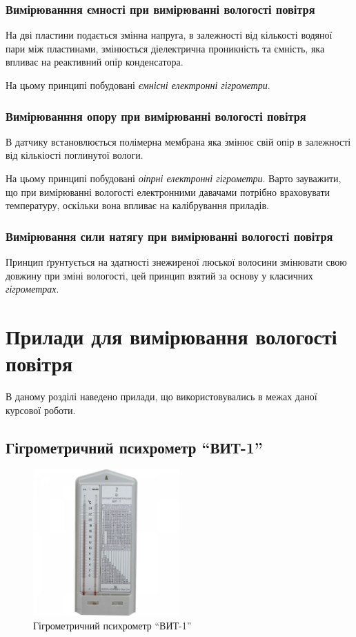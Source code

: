 \subsubsection{Вимірюванння ємності  при вимірюванні вологості повітря}

На дві пластини подається змінна напруга, в залежності від кількості водяної пари між пластинами,
змінюється діелектрична проникність та ємність, яка впливає на реактивний опір конденсатора.

На цьому принципі побудовані \textit{ємнісні електронні гігрометри}.

\subsubsection{Вимірюванння опору при вимірюванні вологості повітря}

В датчику встановлюється полімерна мембрана яка змінює свій опір в залежності від кількіості
поглинутої вологи.

На цьому принципі побудовані \textit{оіпрні електронні гігрометри}. Варто зауважити, що при
вимірюванні вологості електронними давачами потрібно враховувати температуру, оскільки вона впливає
на калібрування приладів.

\subsubsection{Вимірювання сили натягу при вимірюванні вологості повітря}

Принцип ґрунтується на здатності знежиреної люської волосини змінювати свою довжину при зміні
вологості, цей принцип взятий за основу у класичних \textit{гігрометрах}.

\section{Прилади для вимірювання вологості повітря}

В даному розділі наведено прилади, що використовувались в межах даної курсової роботи.

\subsection{Гігрометричний психрометр ``ВИТ-1''}

\begin{figure}[!ht]
\centering
\includegraphics[width=0.5\textwidth]{./images/vit.jpg}
\caption{Гігрометричний психрометр ``ВИТ-1''}
\label{fig:vit}
\end{figure}

